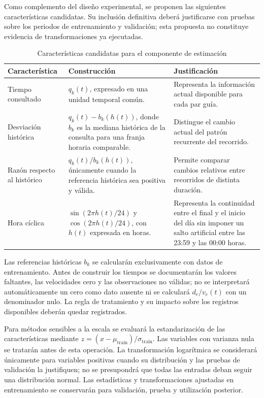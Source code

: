 \documentclass[11pt]{article}
\begin{document}
Como complemento del diseño experimental, se proponen las siguientes
características candidatas. Su inclusión definitiva deberá justificarse con
pruebas sobre los periodos de entrenamiento y validación; esta propuesta no
constituye evidencia de transformaciones ya ejecutadas.

\begin{table}[ht]
\centering
\small
\caption{Características candidatas para el componente de estimación}
\label{tab:caracteristicas}
\renewcommand{\arraystretch}{1.15}
\begin{tabularx}{\textwidth}{@{}p{}X X@{}}
\toprule
\textbf{Característica} & \textbf{Construcción} & \textbf{Justificación} \\
\midrule
Tiempo consultado & \(q_k(t)\), expresado en una unidad temporal común. &
Representa la información actual disponible para cada par guía. \\
Desviación histórica & \(q_k(t)-b_k(h(t))\), donde \(b_k\) es la mediana
histórica de la consulta para una franja horaria comparable. &
Distingue el cambio actual del patrón recurrente del recorrido. \\
Razón respecto al histórico & \(q_k(t)/b_k(h(t))\), únicamente cuando la
referencia histórica sea positiva y válida. &
Permite comparar cambios relativos entre recorridos de distinta duración. \\
Hora cíclica & \(\sin(2\pi h(t)/24)\) y \(\cos(2\pi h(t)/24)\), con
\(h(t)\) expresada en horas. &
Representa la continuidad entre el final y el inicio del día sin imponer un
salto artificial entre las 23:59 y las 00:00 horas. \\
\bottomrule
\end{tabularx}
\end{table}
\FloatBarrier

Las referencias históricas \(b_k\) se calcularán exclusivamente con datos de
entrenamiento. Antes de construir los tiempos se documentarán los valores
faltantes, las velocidades cero y las observaciones no válidas; no se
interpretará automáticamente un cero como dato ausente ni se calculará
\(d_e/v_e(t)\) con un denominador nulo. La regla de tratamiento y su impacto
sobre los registros disponibles deberán quedar registrados.

Para métodos sensibles a la escala se evaluará la estandarización de las
características mediante \(z=(x-\mu_{\mathrm{train}})/\sigma_{\mathrm{train}}\).
Las variables con varianza nula se tratarán antes de esta operación. La
transformación logarítmica se considerará únicamente para variables positivas
cuando su distribución y las pruebas de validación la justifiquen; no se
presupondrá que todas las entradas deban seguir una distribución normal. Las
estadísticas y transformaciones ajustadas en entrenamiento se conservarán
para validación, prueba y utilización posterior.
\end{document}
